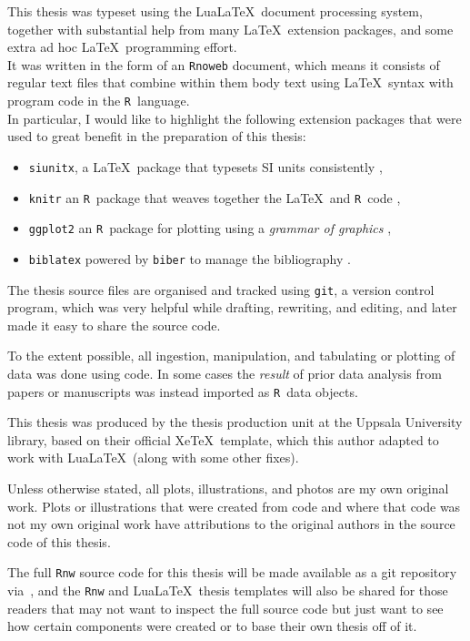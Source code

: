 \documentclass[draft,webedition,openright,titles,swedish,english]{LuaUUThesis}\usepackage[]{graphicx}\usepackage[]{xcolor}
\newcommand{\R}{\texttt{R}}
\newcommand{\XeTeX}{\mbox{Xe\TeX}}
\newcommand{\LuaLaTeX}{\mbox{Lua\LaTeX}}
\newcommand{\via}{via}
\begin{document}
This thesis was typeset using the \LuaLaTeX\ document processing system,
together with substantial help from many \LaTeX\ extension packages, and
some extra ad hoc \LaTeX\ programming effort.\\
It was written in the form of an \texttt{Rnoweb} document, which
means it consists of regular text files that combine within them body text
using \LaTeX\ syntax with program code in the \R\ language.\\
In particular, I would like to highlight the following extension packages
that were used to great benefit in the preparation of this thesis:
\begin{itemize}
\item \texttt{siunitx}, a \LaTeX\ package that typesets SI units consistently \cite{Wright2023},
\item \texttt{knitr} an \R\ package that weaves together the \LaTeX\ and \R\ code \cite{Xie2015},
\item \texttt{ggplot2} an \R\ package for plotting using a \emph{grammar of graphics} \cite{Wickham2016},
\item \texttt{biblatex} powered by \texttt{biber} to manage the bibliography \cite{Kime2023,Kime2022}.
\end{itemize}


The thesis source files are organised and tracked using \texttt{git},
a version control program, which was very helpful while drafting, rewriting, and editing,
and later made it easy to share the source code.

To the extent possible, all ingestion, manipulation, and tabulating
or plotting of data was done using code.
In some cases the \emph{result} of prior data analysis from papers or manuscripts
was instead imported as \R\ data objects.

This thesis was produced by the thesis production unit at the Uppsala University library,
based on their official \XeTeX\ template, which this author adapted to work
with \LuaLaTeX\ (along with some other fixes).

Unless otherwise stated, all plots, illustrations, and photos are my
own original work.
Plots or illustrations that were created from code and where that code
was not my own original work have attributions to the original authors
in the source code of this thesis.

The full \texttt{Rnw} source code for this thesis will be made available
as a git repository \via\ ,
and the \texttt{Rnw} and \LuaLaTeX\ thesis templates will also be shared
for those readers that may not want to inspect the full source code
but just want to see how certain components were created or to base their own
thesis off of it.
\end{document}
